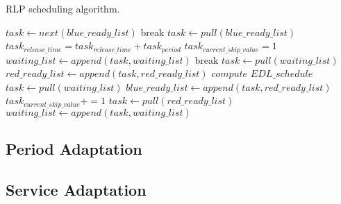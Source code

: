 \begin{algorithm}
\caption{RLP scheduling algorithm.\label{alg:rlp}}
\begin{algorithmic}
\STATE $task \leftarrow next(blue\_ready\_list)$
\STATE break
\ENDIF
\STATE $task \leftarrow pull(blue\_ready\_list)$
\STATE $task_{release\_time} = task_{release\_time} + task_{period}$
\STATE $task_{current\_skip\_value} = 1$
\STATE $waiting\_list \leftarrow append(task, waiting\_list)$
\ENDWHILE
\STATE break
\ENDIF
{}
\STATE $task \leftarrow pull(waiting\_list)$
\STATE $red\_ready\_list \leftarrow append(task, red\_ready\_list)$
\ELSE 
{}
\STATE$compute$ $EDL\_schedule$
\ENDIF
{}
\STATE $task \leftarrow pull(waiting\_list)$
\STATE $blue\_ready\_list \leftarrow append(task, red\_ready\_list)$
\ENDIF
\ENDIF
\STATE $task_{current\_skip\_value} += 1$
\ENDWHILE
{}
\STATE $task \leftarrow pull(red\_ready\_list)$
\STATE $waiting\_list \leftarrow append(task, waiting\_list)$
\ENDWHILE
\ENDIF
\end{algorithmic}
\end{algorithm}

\subsection{Period Adaptation}
\subsection{Service Adaptation}